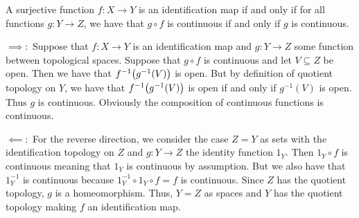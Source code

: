 \documentclass[letterpaper, 11pt, oneside]{book}
\begin{document}
\begin{prop}\label{prop: id_map_iff_all_g_cont}
  A surjective function $f\colon X \to Y$ is an identification map if and only if for all functions $g\colon Y \to Z$, we have that $g \circ f$ is continuous if and only if $g$ is continuous.
\end{prop}
\begin{pf}
  $\implies\colon$ Suppose that $f\colon X \to Y$ is an identification map and $g\colon Y \to Z$ some function between topological spaces.
  Suppose that $g \circ f$ is continuous and let $V \subseteq Z$ be open.
  Then we have that $f^{-1}\pqty{g^{-1}\pqty{V}}$ is open.
  But by definition of quotient topology on $Y$, we have that $f^{-1}\pqty{g^{-1}\pqty{V}}$ is open if and only if $g^{-1}(V)$ is open.
  Thus $g$ is continuous.
  Obviously the composition of continuous functions is continuous.

  $\impliedby\colon$ For the reverse direction, we consider the case  $Z = Y$ as sets with the identification topology on $Z$ and $g\colon Y \to Z$ the identity function $1_{Y}$.
  Then $1_{Y} \circ f$ is continuous meaning that $1_{Y}$ is continuous by assumption.
  But we also have that $1_{Y}^{-1}$ is continuous because $1_{Y}^{-1} \circ 1_{Y} \circ f = f$ is continuous.
  Since $Z$ has the quotient topology, $g$ is a homeomorphism.
  Thus, $Y = Z$ as spaces and $Y$ has the quotient topology making $f$ an identification map.
\end{pf}
\end{document}
